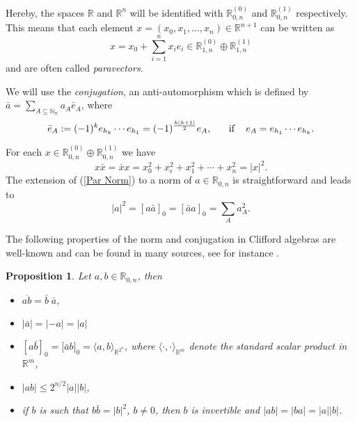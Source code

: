 \documentclass[12pt]{amsart}
\newtheorem{proposition}[theorem]{Proposition}
\theoremstyle{definition}
\newcommand{\R}{\mathbb{R}}
\newcommand{\N}{\mathbb{N}}
\newcommand{\Cl}{\R_{0,n}}
\newcommand{\inci}{\subseteq}
\newcommand{\ba}{\overline}
\begin{document}
Hereby, the spaces $\R$ and $\R^n$ will be identified with 
 $\R_{0,n}^{(0)}$ and $\R_{0,n}^{(1)}$ respectively. This means that each element $x=(x_0, x_1,\ldots, x_n)\in\R^{n+1}$ can be written as
	\[x=x_0+ \sum_{i=1}^nx_ie_i\in\R_{1,n}^{(0)}\oplus\R_{1,n}^{(1)}
\]
and are often called {\it paravectors}. 


We will use the {\it conjugation}, an anti-automorphism which is defined by $\bar{a}=\sum_{A\inci\N_n}a_A\bar{e}_A$, where 
	\[\bar{e}_A:=(-1)^ke_{h_k}\cdots e_{h_1}=(-1)^{\frac{k(k+1)}{2}}e_A, \hspace{.5cm}\mbox{ if  } \hspace{.3cm} e_A=e_{h_1}\cdots e_{h_k}.
\]

For each $x\in \R_{0,n}^{(0)}\oplus\R_{0,n}^{(1)}$ we have 
\begin{equation}\label{Par Norm}
x\bar{x}=\bar{x}x=x_0^2+x_\epsilon^2 + x_1^2+\cdots+x_n^2=|x|^2.
\end{equation}
The extension of (\ref{Par Norm}) to a norm of $a\in\R_{0,n}$ is straightforward and leads to 
	\[|a|^2=[a\bar{a}]_0=[\bar{a}a]_0=\sum_A a_A^2.
\]

The following properties of the norm and conjugation in Clifford algebras are well-known and can be found in many sources, see for instance \cite{DSS}. 
\begin{proposition}
Let $a,b\in\Cl$, then
\begin{itemize}
  \item[(i)] $\ba{ab}=\bar{b}\; \bar{a}$,
	\item[(ii)] $|\bar{a}|=|-a|=|a|$ 
	\item[(iii)] $\left[a\bar{b}\right]_0=\big[\bar{a}b\big]_0=\langle a, b\rangle_{\R^{2^n}}$, where $\langle \cdot, \cdot\rangle_{\R^m}$ denote the standard scalar product in $\R^{m}$,
	\item[(iv)] $|ab|\leq 2^{n/2}|a||b|$,
	\item[(v)] if $b$ is such that $b\bar{b}=|b|^2$, $b\neq 0$, then $b$ is invertible and $|ab|=|ba|=|a||b|$.
\end{itemize}
\end{proposition}
\end{document}
